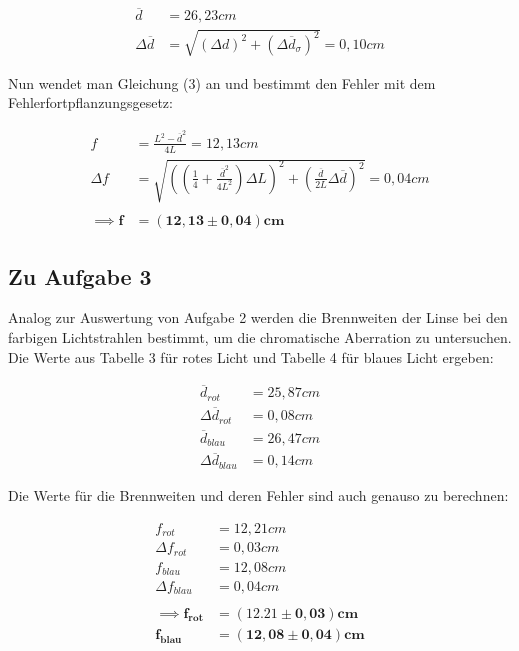 \documentclass{article}
\begin{document}
\begin{equation}
    \begin{split}
        \overline{d} &= 26,23cm \\
        \Delta \overline{d} &= \sqrt{(\Delta d)^2 + (\Delta \overline{d}_{\sigma})^2} = 0,10cm 
    \end{split}
\end{equation}

Nun wendet man Gleichung (3) an und bestimmt den Fehler mit dem Fehlerfortpflanzungsgesetz:

\begin{equation}
    \begin{split}
        f &= \frac{L^2 - {\overline{d}}^2}{4 L} = 12,13cm \\
        \Delta f &= \sqrt{\left( \left( \frac{1}{4} + \frac{\overline{d}^2}{4 L^2} \right) \Delta L \right)^2 + \left( \frac{\overline{d}}{2L} \Delta \overline{d} \right)^2} = 0,04cm \\ \\
        \implies \bm{f} &= \bm{(12,13 \pm 0,04)cm}
    \end{split}
\end{equation}

\subsection{Zu Aufgabe 3}

Analog zur Auswertung von Aufgabe 2 werden die Brennweiten der Linse bei den farbigen Lichtstrahlen bestimmt, um die chromatische Aberration zu untersuchen. Die Werte aus Tabelle 3 für rotes Licht und Tabelle 4 für blaues Licht ergeben:

\begin{equation}
    \begin{split}
        \overline{d}_{rot} &= 25,87cm \\
        \Delta \overline{d}_{rot} &= 0,08cm \\
        \overline{d}_{blau} &= 26,47cm \\
        \Delta \overline{d}_{blau} &= 0,14cm
    \end{split}
\end{equation}

Die Werte für die Brennweiten und deren Fehler sind auch genauso zu berechnen:

\begin{equation}
    \begin{split}
        f_{rot} &= 12,21cm \\
        \Delta f_{rot} &= 0,03cm \\
        f_{blau} &= 12,08cm \\
        \Delta f_{blau} &= 0,04cm \\ \\
        \implies \bm{f_{rot}} &= \bm{(12.21 \pm 0,03)cm} \\
        \bm{f_{blau}} &= \bm{(12,08 \pm 0,04)cm}
    \end{split}
\end{equation}
\end{document}
